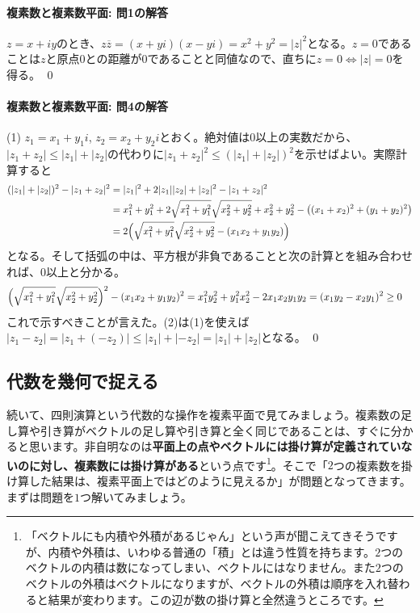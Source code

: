 \paragraph{複素数と複素数平面: 問1の解答}
$z=x+iy$のとき、$z\overline{z}=(x+yi)(x-yi)=x^2+y^2=|z|^2$となる。$z=0$であることは$z$と原点$0$との距離が$0$であることと同値なので、直ちに$z=0\Leftrightarrow|z|=0$を得る。 \qed

\paragraph{複素数と複素数平面: 問4の解答}

(1) $z_1 = x_1+y_1 i$, $z_2 = x_2 + y_2 i$とおく。絶対値は$0$以上の実数だから、$|z_1+z_2|\leq |z_1|+|z_2|$の代わりに$|z_1+z_2|^2\leq (|z_1|+|z_2|)^2$を示せばよい。実際計算すると
\begin{align*}
(|z_1|+|z_2|)^2 - |z_1+z_2|^2 
&= |z_1|^2 + 2|z_1||z_2| + |z_2|^2 - |z_1+z_2|^2 \\
&= x_1^2+y_1^2 + 2\sqrt{x_1^2+y_1^2}\sqrt{x_2^2+y_2^2} + x_2^2 + y_2^2 - \bigl((x_1+x_2)^2+(y_1+y_2)^2\bigr) \\
&= 2\Bigl(\sqrt{x_1^2+y_1^2}\sqrt{x_2^2+y_2^2} -(x_1x_2+y_1y_2) \Bigr)
\end{align*}
となる。そして括弧の中は、平方根が非負であることと次の計算とを組み合わせれば、$0$以上と分かる。
\begin{align*}
\Bigl(\sqrt{x_1^2+y_1^2}\sqrt{x_2^2+y_2^2}\Bigr)^2 - (x_1x_2+y_1y_2)^2
&= x_1^2y_2^2+y_1^2x_2^2 - 2x_1x_2y_1y_2 = (x_1y_2-x_2y_1)^2 \geq 0
\end{align*}
これで示すべきことが言えた。(2)は(1)を使えば$|z_1-z_2| = |z_1 + (-z_2) | \leq |z_1|+|{-z_2}| = |z_1| + |z_2|$となる。 \qed


\subsection{代数を幾何で捉える}

続いて、四則演算という代数的な操作を複素平面で見てみましょう。複素数の足し算や引き算がベクトルの足し算や引き算と全く同じであることは、すぐに分かると思います。非自明なのは\textbf{平面上の点やベクトルには掛け算が定義されていないのに対し、複素数には掛け算がある}という点です\footnote{「ベクトルにも内積や外積があるじゃん」という声が聞こえてきそうですが、内積や外積は、いわゆる普通の「積」とは違う性質を持ちます。$2$つのベクトルの内積は数になってしまい、ベクトルにはなりません。また$2$つのベクトルの外積はベクトルになりますが、ベクトルの外積は順序を入れ替わると結果が変わります。この辺が数の掛け算と全然違うところです。}。そこで「$2$つの複素数を掛け算した結果は、複素平面上ではどのように見えるか」が問題となってきます。まずは問題を$1$つ解いてみましょう。


